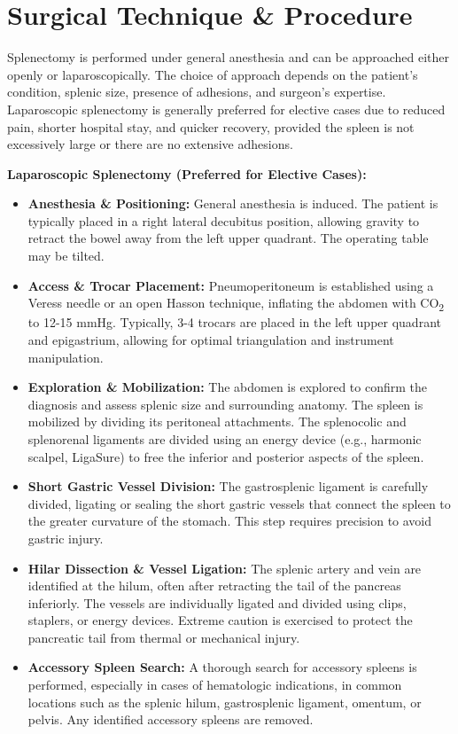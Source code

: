 \section*{Surgical Technique \& Procedure}
Splenectomy is performed under general anesthesia and can be approached either openly or laparoscopically. The choice of approach depends on the patient's condition, splenic size, presence of adhesions, and surgeon's expertise. Laparoscopic splenectomy is generally preferred for elective cases due to reduced pain, shorter hospital stay, and quicker recovery, provided the spleen is not excessively large or there are no extensive adhesions.

\textbf{Laparoscopic Splenectomy (Preferred for Elective Cases):}
\begin{itemize}
  \item \textbf{Anesthesia \& Positioning:} General anesthesia is induced. The patient is typically placed in a right lateral decubitus position, allowing gravity to retract the bowel away from the left upper quadrant. The operating table may be tilted.
  \item \textbf{Access \& Trocar Placement:} Pneumoperitoneum is established using a Veress needle or an open Hasson technique, inflating the abdomen with CO\textsubscript{2} to 12-15 mmHg. Typically, 3-4 trocars are placed in the left upper quadrant and epigastrium, allowing for optimal triangulation and instrument manipulation.
  \item \textbf{Exploration \& Mobilization:} The abdomen is explored to confirm the diagnosis and assess splenic size and surrounding anatomy. The spleen is mobilized by dividing its peritoneal attachments. The splenocolic and splenorenal ligaments are divided using an energy device (e.g., harmonic scalpel, LigaSure) to free the inferior and posterior aspects of the spleen.
  \item \textbf{Short Gastric Vessel Division:} The gastrosplenic ligament is carefully divided, ligating or sealing the short gastric vessels that connect the spleen to the greater curvature of the stomach. This step requires precision to avoid gastric injury.
  \item \textbf{Hilar Dissection \& Vessel Ligation:} The splenic artery and vein are identified at the hilum, often after retracting the tail of the pancreas inferiorly. The vessels are individually ligated and divided using clips, staplers, or energy devices. Extreme caution is exercised to protect the pancreatic tail from thermal or mechanical injury.
  \item \textbf{Accessory Spleen Search:} A thorough search for accessory spleens is performed, especially in cases of hematologic indications, in common locations such as the splenic hilum, gastrosplenic ligament, omentum, or pelvis. Any identified accessory spleens are removed.

\end{itemize}
